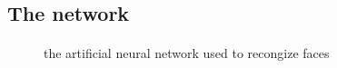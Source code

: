     \subsection{The network}

    \paragraph{}{
    }

    \begin{figure}[!h]
        \label{fig:ann}
        \begin{center}
            
        \end{center}
        \caption{the artificial neural network used to recongize faces}
    \end{figure}

    \paragraph{}{
    }

